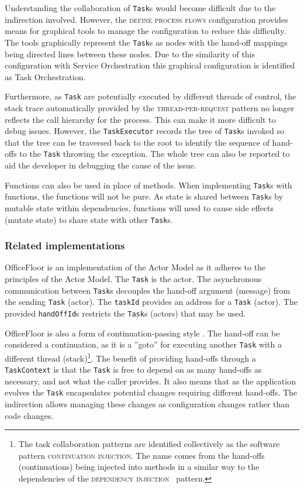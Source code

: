 \documentclass[prodmode]{style/acmlarge}
\begin{document}
Understanding the collaboration of \texttt{Task}s would become difficult due to
the indirection involved.  However, the \textsc{define process flows}
configuration provides means for graphical tools to manage the configuration to
reduce this difficulty.  The tools graphically represent the \texttt{Task}s as
nodes with the hand-off mappings being directed lines between these nodes.  Due
to the similarity of this configuration with Service Orchestration this
graphical configuration is identified as Task Orchestration.

Furthermore, as \texttt{Task} are potentially executed by different threads of
control, the stack trace automatically provided by the
\textsc{thread-per-request} pattern no longer reflects the call hierarchy for
the process.  This can make it more difficult to debug issues.  However, the
\texttt{TaskExecutor} records the tree of \texttt{Task}s invoked so that the
tree can be traversed back to the root to identify the sequence of hand-offs to
the \texttt{Task} throwing the exception.  The whole tree can also be reported
to aid the developer in debugging the cause of the issue.

Functions can also be used in place of methods.  When implementing
\texttt{Task}s with functions, the functions will not be pure.  As state is
shared between \texttt{Task}s by mutable state within dependencies, functions
will need to cause side effects (mutate state) to share state with other
\texttt{Task}s.



\subsubsection*{Related implementations}

OfficeFloor is an implementation of the Actor Model \cite{actors} as it adheres
to the principles of the Actor Model.  The \texttt{Task} is the actor.  The
asynchronous communication between \texttt{Task}s decouples the hand-off
argument (message) from the sending \texttt{Task} (actor).  The \texttt{taskId}
provides an address for a \texttt{Task} (actor).  The provided
\texttt{handOffId}s restricts the \texttt{Task}s (actors) that may be used.

OfficeFloor is also a form of continuation-passing style \cite{continuations}.
The hand-off can be considered a continuation, as it is a ''goto'' for executing
another \texttt{Task} with a different thread (stack)\footnote{The task
collaboration patterns are identified collectively as the software pattern \textsc{continuation
injection}.  The name comes from the hand-offs (continuations) being injected
into methods in a similar way to the dependencies of the \textsc{dependency
injection}~\cite{ioc} pattern.}.  The benefit of providing hand-offs through a
\texttt{TaskContext} is that the \texttt{Task} is free to depend on as many
hand-offs as necessary, and not what the caller provides.  It also means that as
the application evolves the \texttt{Task} encapsulates potential changes
requiring different hand-offs.  The indirection allows managing these changes as
configuration changes rather than code changes.
\end{document}
